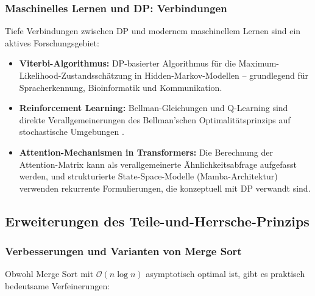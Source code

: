 ﻿\documentclass[a4paper,12pt]{article}
\theoremstyle{definition}
\begin{document}
\subsubsection{Maschinelles Lernen und DP: Verbindungen}

Tiefe Verbindungen zwischen DP und modernem maschinellem Lernen sind ein aktives
Forschungsgebiet:
\begin{itemize}
    \item \textbf{Viterbi-Algorithmus:} DP-basierter Algorithmus für die
          Maximum-Likelihood-Zustandsschätzung in Hidden-Markov-Modellen --
          grundlegend für Spracherkennung, Bioinformatik und Kommunikation.
    \item \textbf{Reinforcement Learning:} Bellman-Gleichungen und
          Q-Learning sind direkte Verallgemeinerungen des Bellman'schen
          Optimalitätsprinzips auf stochastische Umgebungen \cite{sutton2018}.
    \item \textbf{Attention-Mechanismen in Transformers:} Die Berechnung der
          Attention-Matrix kann als verallgemeinerte Ähnlichkeitsabfrage
          aufgefasst werden, und strukturierte State-Space-Modelle
          (Mamba-Architektur) verwenden rekurrente Formulierungen, die
          konzeptuell mit DP verwandt sind.
\end{itemize}

\subsection{Erweiterungen des Teile-und-Herrsche-Prinzips}

\subsubsection{Verbesserungen und Varianten von Merge Sort}

Obwohl Merge Sort mit $\mathcal{O}(n \log n)$ asymptotisch optimal ist, gibt es
praktisch bedeutsame Verfeinerungen:
\end{document}
